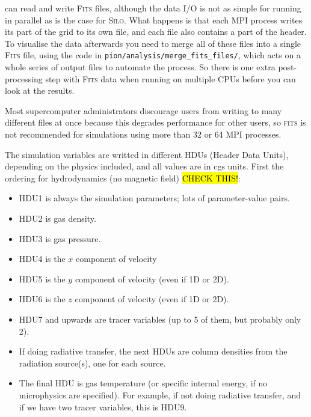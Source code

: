 \documentclass[a4paper,11pt]{report}
\begin{document}
\pion{} can read and write \textsc{Fits} files, although the data I/O is not as simple for running in parallel as is the case for \textsc{Silo}.
What happens is that each MPI process writes its part of the grid to its own file, and each file also contains a part of the header.
To visualise the data afterwards you need to merge all of these files into a single \textsc{Fits} file, using the code in 
\lstinline|pion/analysis/merge_fits_files/|,
which acts on a whole series of output files to automate the process.
So there is one extra post-processing step with \textsc{Fits} data when running on multiple CPUs before you can look at the results.

Most supercomputer administrators discourage users from writing to many different files at once because this degrades performance for other users, so \textsc{fits} is not recommended for simulations using more than 32 or 64 MPI processes.

The simulation variables are writted in different HDUs (Header Data Units), depending on the physics included, and all values are in cgs units.
First the ordering for hydrodynamics (no magnetic field) \hl{CHECK THIS!}:
\begin{itemize}
\item HDU1 is always the simulation parameters; lots of parameter-value pairs.
\item HDU2 is gas density.
\item HDU3 is gas pressure.
\item HDU4 is the $x$ component of velocity
\item HDU5 is the $y$ component of velocity (even if 1D or 2D).
\item HDU6 is the $z$ component of velocity (even if 1D or 2D).
\item HDU7 and upwards are tracer variables (up to 5 of them, but probably only 2).
\item If doing radiative transfer, the next HDUs are column densities from the radiation source(s), one for each source.
\item The final HDU is gas temperature (or specific internal energy, if no microphysics are specified).
  For example, if not doing radiative transfer, and if we have two tracer variables, this is HDU9.
\end{itemize}
\end{document}
